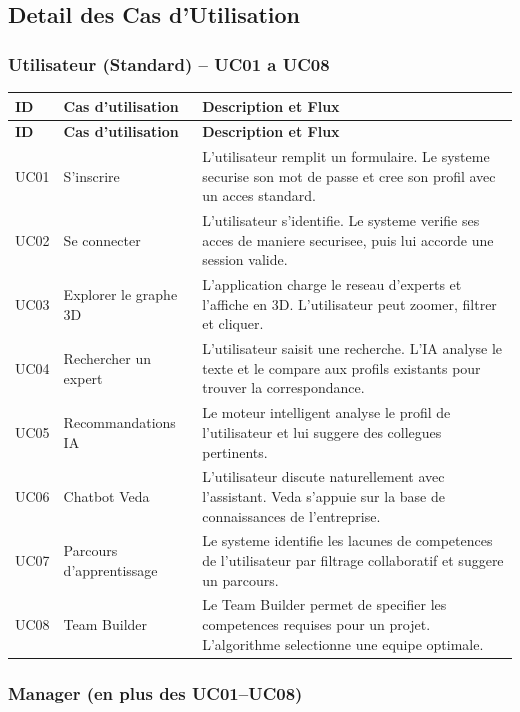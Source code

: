 \documentclass[12pt,a4paper]{article}
\begin{document}
\subsection{Detail des Cas d'Utilisation}

\subsubsection{Utilisateur (Standard) -- UC01 a UC08}

\begin{longtable}{|p{1cm}|p{4cm}|p{8.5cm}|}
\toprule
\rowcolor{bleu!15}
\textbf{ID} & \textbf{Cas d'utilisation} & \textbf{Description et Flux} \\
\midrule
\endfirsthead
\toprule
\rowcolor{bleu!15}
\textbf{ID} & \textbf{Cas d'utilisation} & \textbf{Description et Flux} \\
\midrule
\endhead
UC01 & S'inscrire & L'utilisateur remplit un formulaire. Le systeme securise son mot de passe et cree son profil avec un acces standard. \\
\midrule
UC02 & Se connecter & L'utilisateur s'identifie. Le systeme verifie ses acces de maniere securisee, puis lui accorde une session valide. \\
\midrule
UC03 & Explorer le graphe 3D & L'application charge le reseau d'experts et l'affiche en 3D. L'utilisateur peut zoomer, filtrer et cliquer. \\
\midrule
UC04 & Rechercher un expert & L'utilisateur saisit une recherche. L'IA analyse le texte et le compare aux profils existants pour trouver la correspondance. \\
\midrule
UC05 & Recommandations IA & Le moteur intelligent analyse le profil de l'utilisateur et lui suggere des collegues pertinents. \\
\midrule
UC06 & Chatbot Veda & L'utilisateur discute naturellement avec l'assistant. Veda s'appuie sur la base de connaissances de l'entreprise. \\
\midrule
UC07 & Parcours d'apprentissage & Le systeme identifie les lacunes de competences de l'utilisateur par filtrage collaboratif et suggere un parcours. \\
\midrule
UC08 & Team Builder & Le Team Builder permet de specifier les competences requises pour un projet. L'algorithme selectionne une equipe optimale. \\
\bottomrule
\end{longtable}

\subsubsection{Manager (en plus des UC01--UC08)}
\end{document}
